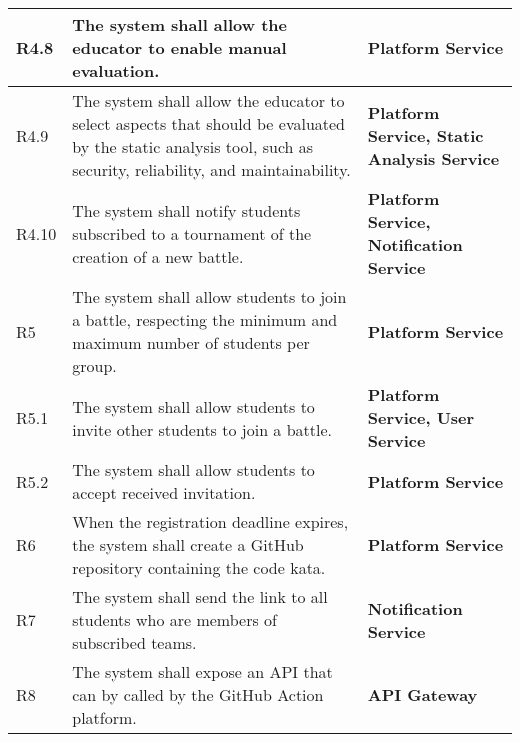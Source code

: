 \begin{center}
\begin{longtable}{|l|p{8cm}|p{5cm}|}
        R4.8  & The system shall allow the educator to enable manual evaluation.                                                                                                               & \textbf{Platform Service}                                                  \\\hline
        R4.9  & The system shall allow the educator to select aspects that should be evaluated by the static analysis tool, such as security, reliability, and maintainability.                & \textbf{Platform Service, Static Analysis Service}                         \\\hline
        R4.10 & The system shall notify students subscribed to a tournament of the creation of a new battle.                                                                                   & \textbf{Platform Service, Notification Service}                            \\\hline
        R5    & The system shall allow students to join a battle, respecting the minimum and maximum number of students per group.                                                             & \textbf{Platform Service}                                                  \\\hline
        R5.1  & The system shall allow students to invite other students to join a battle.                                                                                                     & \textbf{Platform Service, User Service}                                    \\\hline
        R5.2  & The system shall allow students to accept received invitation.                                                                                                                 & \textbf{Platform Service}                                                  \\\hline
        R6    & When the registration deadline expires, the system shall create a GitHub repository containing the code kata.                                                                  & \textbf{Platform Service}                                                  \\\hline
        R7    & The system shall send the link to all students who are members of subscribed teams.                                                                                            & \textbf{Notification Service}                                              \\\hline
        R8    & The system shall expose an API that can by called by the GitHub Action platform.                                                                                               & \textbf{API Gateway}                                                       \\\hline

\end{longtable}
\end{center}
